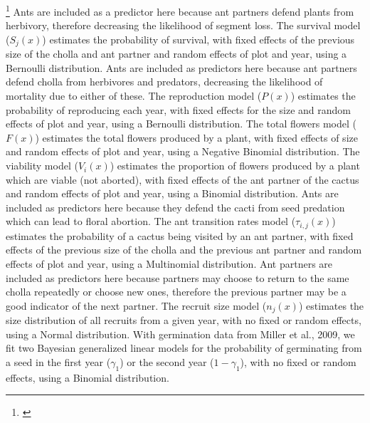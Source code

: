 \documentclass[11pt]{article}
\newcommand{\tom}[2]{{\color{red}{#1}}\footnote{\textit{\color{red}{#2}}}}
\begin{document}
\tom{The growth model ($G_j(y,x)$) estimates the size of cholla, with fixed effects of the previous size and ant partner and random effects of plot and year, using a Skew Normal distribution, with $\omega$ and $\alpha$ varying with the previous size. }{I think you need to explain this more thoroughly, and also explain why you used a Skewed Normal. Omega and alpha need to be defined and explained, and this is best done showing the full notation of the model.}
Ants are included as a predictor here because ant partners defend plants from herbivory, therefore decreasing the likelihood of segment loss.
The survival model ($S_j(x)$) estimates the probability of survival, with fixed effects of the previous size of the cholla and ant partner and random effects of plot and year, using a Bernoulli distribution. 
Ants are included as predictors here because ant partners defend cholla from herbivores and predators, decreasing the likelihood of mortality due to either of these. 
The reproduction model ($P(x)$) estimates the probability of reproducing each year, with fixed effects for the size and random effects of plot and year, using a Bernoulli distribution. 
The total flowers model ($F(x)$) estimates the total flowers produced by a plant, with fixed effects of size and random effects of plot and year, using a Negative Binomial distribution. 
The viability model ($V_i(x)$) estimates the proportion of flowers produced by a plant which are viable (not aborted), with fixed effects of the ant partner of the cactus and random effects of plot and year, using a Binomial distribution.
Ants are included as predictors here because they defend the cacti from seed predation which can lead to floral abortion. 
The ant transition rates model ($\tau_{i,j}(x)$) estimates the probability of a cactus being visited by an ant partner, with fixed effects of the previous size of the cholla and the previous ant partner and random effects of plot and year, using a Multinomial distribution.  
Ant partners are included as predictors here because partners may choose to return to the same cholla repeatedly or choose new ones, therefore the previous partner may be a good indicator of the next partner. 
The recruit size model ($n_j(x)$) estimates the size distribution of all recruits from a given year, with no fixed or random effects, using a Normal distribution. 
With germination data from Miller et al., 2009, we fit two Bayesian generalized linear models for the probability of germinating from a seed in the first year ($\gamma_1$) or the second year ($1 - \gamma_1$), with no fixed or random effects, using a Binomial distribution.
\end{document}
